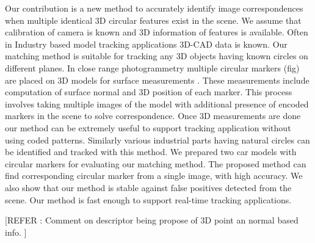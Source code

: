 \documentclass{bmvc2k}
\begin{document}
Our contribution is a new method to accurately identify image correspondences when multiple identical 3D circular features exist in the scene. We assume that calibration of camera is known and 3D information of features is available. 
Often in Industry based model tracking applications 3D-CAD data is known. Our matching method is suitable for tracking any 3D objects having known circles on different planes. In close range photogrammetry multiple circular markers (fig) are placed on 3D models for surface measurements \cite{luhmann_close_2006}. 
These measurements include computation of surface normal and 3D position of each marker. 
This process involves taking multiple images of the model with additional presence of encoded markers in the scene to solve correspondence. 
Once 3D measurements are done our method can be extremely useful to support tracking application without using coded patterns. Similarly various industrial parts having natural circles can be identified and tracked with this method. 
We prepared two car models with circular markers for evaluating our matching method. The proposed method can find corresponding circular marker from a single image, with high accuracy. We also show that our method is stable against false positives detected from the scene. Our method is fast enough to support real-time tracking applications. 

[REFER : Comment on descriptor being propose of 3D point an normal based info. ]

\end{document}
